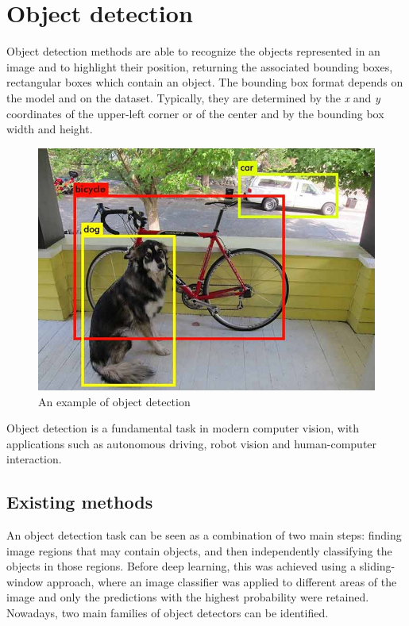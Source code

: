 \documentclass[%
    corpo=12pt,
    twoside,
    stile=classica,   
    tipotesi=magistrale,
    evenboxes,
    english,
	numerazioneromana,
]{toptesi}
\begin{document}
\section{Object detection}\label{sec:detection}
Object detection methods are able to recognize the objects represented in an image and to highlight their position, returning the associated bounding boxes, rectangular boxes which contain an object. The bounding box format depends on the model and on the dataset. Typically, they are determined by the \textit{x} and \textit{y} coordinates of the upper-left corner
or of the center
and by the bounding box width and height.

\begin{figure}[ht]
	\centering
	\includegraphics[width=.5\textwidth]{imgs/yolo_detection.png}
	\caption{An example of object detection\cite{redmon2016look}}
\end{figure}

Object detection is a fundamental task in modern computer vision, with applications such as autonomous driving, robot vision and human-computer interaction.

\subsection{Existing methods}\label{sec:detectors}
An object detection task can be seen as a combination of two main steps: finding image regions that may contain objects, and then independently classifying the objects in those regions. Before deep learning, this was achieved using a sliding-window approach, where an image classifier was applied to different areas of the image and only the predictions with the highest probability were retained. Nowadays, two main families of object detectors can be identified.
\end{document}
